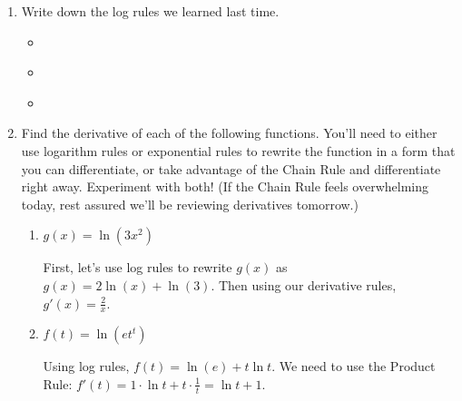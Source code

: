 \documentclass{article}
\begin{document}
\begin{enumerate}[resume]
\item 
  \begin{problem}[1.25in]
    Write down the log rules we learned last time.
  \end{problem}

  \begin{solution}
    \begin{itemize}[topsep=0pt]
  \item {} \

  \item {}\

  \item {}\

  \end{itemize}  
  \end{solution}

\item 

  Find the derivative of each of the following functions. You'll need to either use logarithm rules or exponential rules to rewrite the function in a form that you can differentiate, or take advantage of the Chain Rule and differentiate right away. Experiment with both! (If the Chain Rule feels overwhelming today, rest assured we'll be reviewing derivatives tomorrow.)

  \begin{enumerate}
  \item
    \begin{problem}[\vfill]
      $g(x) = \ln (3x^2)$
    \end{problem}

    \begin{solution}
      First, let's use log rules to rewrite $g(x)$ as 
      $g(x)=2\ln(x)+\ln(3)$. Then using our derivative rules,
      $g'(x)=\boxed{\frac{2}{x}}$.
    \end{solution}

  \item
    \begin{problem}[\vfill]
      $f(t) = \ln \left( e t^t \right)$
    \end{problem}

    \begin{solution}
      Using log rules, $f(t)=\ln(e) + t\ln t$. We need to use the
      Product Rule:
      $f'(t)=1\cdot\ln t + t \cdot \frac{1}{t} =\boxed{\ln t +1}$.
    \end{solution}


\end{enumerate}
\end{enumerate}
\end{document}
